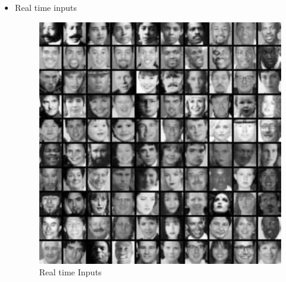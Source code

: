 \documentclass[11pt,a4paper,twoside]{report}
\begin{document}
\begin{itemize}
\item Real time inputs
\begin{center}
\begin{figure}[htpb]
\center \includegraphics[scale=.5]{real}
\caption{Real time Inputs}
\end{figure}


\end{center}
\end{itemize}

\end{document}
